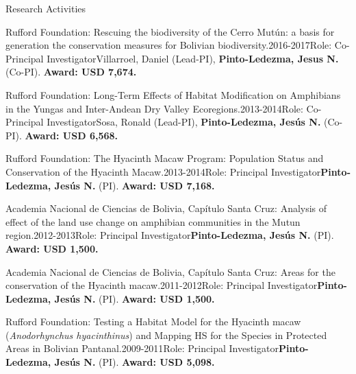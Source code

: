 \documentclass{resume} %
\begin{document}
\begin{rSection}{Research Activities}
\begin{pSubsection}{Rufford Foundation: }{Rescuing the biodiversity of the Cerro Mutún: a basis for generation the conservation measures for Bolivian biodiversity.}{2016-2017}{Role: Co-Principal Investigator}{Villarroel, Daniel (Lead-PI), \textbf{Pinto-Ledezma, Jesus N.} (Co-PI). {\bf Award: USD 7,674.}}
\end{pSubsection}

\begin{pSubsection}{Rufford Foundation: }{Long-Term Effects of Habitat Modification on Amphibians in the Yungas and Inter-Andean Dry Valley Ecoregions.}{2013-2014}{Role: Co-Principal Investigator}{Sosa, Ronald (Lead-PI), \textbf{Pinto-Ledezma, Jesús N.} (Co-PI). {\bf Award: USD 6,568.}}
\end{pSubsection}

\begin{pSubsection}{Rufford Foundation: }{The Hyacinth Macaw Program: Population Status and Conservation of the Hyacinth Macaw.}{2013-2014}{Role: Principal Investigator}{\textbf{Pinto-Ledezma, Jesús N.} (PI). {\bf Award: USD 7,168.}}
\end{pSubsection}

\begin{pSubsection}{Academia Nacional de Ciencias de Bolivia, Capítulo Santa Cruz: }{Analysis of effect of the land use change on amphibian communities in the Mutun region.}{2012-2013}{Role: Principal Investigator}{\textbf{Pinto-Ledezma, Jesús N.} (PI). {\bf Award: USD 1,500.}}
\end{pSubsection}

\begin{pSubsection}{Academia Nacional de Ciencias de Bolivia, Capítulo Santa Cruz: }{Areas for the conservation of the Hyacinth macaw.}{2011-2012}{Role: Principal Investigator}{\textbf{Pinto-Ledezma, Jesús N.} (PI). {\bf Award: USD 1,500.}}
\end{pSubsection}

\begin{pSubsection}{Rufford Foundation: }{Testing a Habitat Model for the Hyacinth macaw (\emph{Anodorhynchus hyacinthinus}) and Mapping HS for the Species in Protected Areas in Bolivian Pantanal.}{2009-2011}{Role: Principal Investigator}{\textbf{Pinto-Ledezma, Jesús N.} (PI). {\bf Award: USD 5,098.}}
\end{pSubsection}

\end{rSection}


\end{document}
